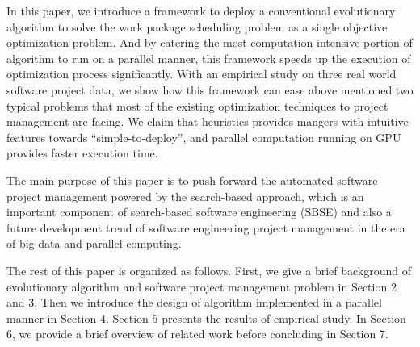 In this paper, we introduce a framework to deploy a conventional evolutionary algorithm to solve the work package scheduling problem as a single objective optimization problem. 
And by catering the most computation intensive portion of algorithm to run on a parallel manner, this framework speeds up the execution of optimization process significantly.
With an empirical study on three real world software project data, we show how this framework can ease above mentioned two typical problems that most of the existing optimization techniques to project management are facing.
We claim that heuristics provides mangers with intuitive features towards ``simple-to-deploy'', and parallel computation running on GPU provides faster execution time.

The main purpose of this paper is to push forward the automated software project management powered by the search-based approach, which is an important component of search-based software engineering (SBSE) and also a future development trend of software engineering project management in the era of big data and parallel computing.

The rest of this paper is organized as follows. First, we give a brief background of evolutionary algorithm and software project management problem in Section 2 and 3. Then we introduce the design of algorithm implemented in a parallel manner in Section 4. Section 5 presents the results of empirical study. In Section 6, we provide a brief overview of related work before concluding in Section 7.






